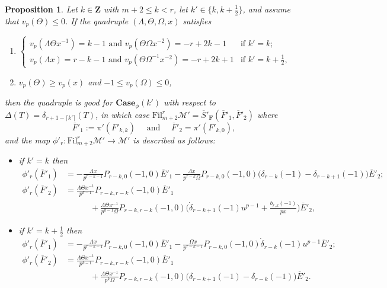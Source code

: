 \documentclass[11pt]{amsart}
\theoremstyle{definition}
\numberwithin{equation}{subsection}
\theoremstyle{plain}
\theoremstyle{plain}
\theoremstyle{plain}
\theoremstyle{plain}
\theoremstyle{plain}
\theoremstyle{plain}
\theoremstyle{plain}
\theoremstyle{plain}
\newtheorem{prop}[equation]{Proposition}
\theoremstyle{plain}
\theoremstyle{plain}
\theoremstyle{plain}
\theoremstyle{plain}
\theoremstyle{definition}
\theoremstyle{definition}
\theoremstyle{definition}
\theoremstyle{remark}
\renewcommand{\(}{\textup{(}}
\renewcommand{\)}{\textup{)}}
\newcommand{\Z}{\mathbf{Z}}
\newcommand{\F}{\mathbf{F}}
\newcommand{\barS}{\overline{S}}
\newcommand{\cM}{\mathcal{M}}
\newcommand{\Fil}{\mathrm{Fil}}
\newcommand{\barE}{\overline{E}}
\newcommand{\barF}{\overline{F}}
\begin{document}
\begin{prop}\label{prop-cM-Case-m+2-r-1}
Let $k\in\Z$ with $m+2\leq k<r$, let $k'\in\{k,k+\frac{1}{2}\}$, and assume that $v_p(\Theta)\leq0$. If the quadruple $(\Lambda,\Theta,\Omega,x)$ satisfies
    \begin{enumerate}[leftmargin=*]
      \item $\begin{cases}
          v_p(\Lambda \Theta x^{-1})=k-1\mbox{ and } v_p(\Theta\Omega x^{-2})=-r+2k-1 & \mbox{if } k'=k; \\
          v_p(\Lambda x)=r-k-1\mbox{ and } v_p(\Theta\Omega^{-1} x^{-2})=-r+2k+1 & \mbox{if }k'=k+\frac{1}{2},
        \end{cases}$
      \item $v_p(\Theta)\geq v_p(x)$ and $-1\leq v_p(\Omega)\leq 0$,
      \end{enumerate}
    then the quadruple is good for $\mathbf{Case}_\phi(k')$ with respect to $\Delta(T)=\delta_{r+1-\lceil k' \rceil}(T)$, in which case
   $\Fil^r_{m+2}\cM'=\barS'_\F(\barF'_1,\barF'_2)$ where
    $$\barF'_1:=\pi'(F'_{k,k})\quad\mbox{ and }\quad \barF'_2=\pi'(F'_{k,0}),$$
and the map $\phi'_r:\Fil^r_{m+2}\cM'\to \cM'$ is described as follows:
\begin{itemize}[leftmargin=*]
\item if $k'=k$ then
    \begin{align*}
    \phi'_r(\barF'_1)&= -\frac{\Lambda x}{p^{r-k-1}}P_{r-k,0}(-1,0)\barE'_1 -\frac{\Lambda x}{p^{r-k}\Omega} P_{r-k,0}(-1,0) \big(\delta_{r-k}(-1)-\delta_{r-k+1}(-1)       \big)\barE'_2;\\
    \phi'_r(\barF'_2)
        &=\frac{\Lambda \Theta x^{-1}}{p^{k-1}}P_{r-k,r-k}(-1,0)\barE'_1
        \\&\hspace{3em}
        +\frac{\Lambda\Theta x^{-1}}{p^{k-1}\Omega} 
        P_{r-k,r-k}(-1,0)\Big(\dot{\delta}_{r-k+1}(-1)u^{p-1}
        +\frac{b_{r,k}(-1)}{px}
        \Big)\barE'_2,
    \end{align*}
\item if $k'=k+\frac{1}{2}$ then
    \begin{align*}
    \phi'_r(\barF'_1)&=-\frac{\Lambda x}{p^{r-k-1}}P_{r-k,0}(-1,0)\barE'_1-\frac{\Omega x}{p^{r-k-1}}P_{r-k,0}(-1,0)\dot{\delta}_{r-k}(-1)u^{p-1}\barE'_2;\\
    \phi'_r(\barF'_2)&=\frac{\Lambda \Theta x^{-1}}{p^{k-1}}P_{r-k,r-k}(-1,0)\barE'_1\\
     &\hspace{3em} +\frac{\Lambda\Theta x^{-1}}{p^k\Omega} P_{r-k,r-k}(-1,0)\big(\delta_{r-k+1}(-1)-\delta_{r-k}(-1)\big)\barE'_2.
    \end{align*}
\end{itemize}
\end{prop}
\end{document}
